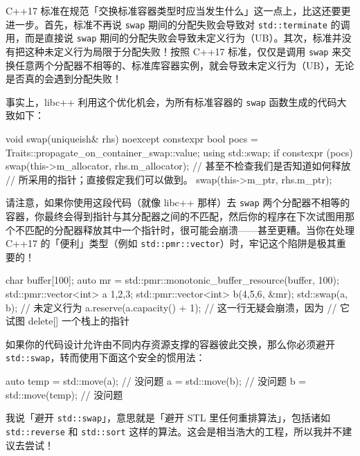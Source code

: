C++17 标准在规范「交换标准容器类型时应当发生什么」这一点上，比这还要更进一步。首先，标准不再说 \texttt{swap} 期间的分配失败会导致对 \texttt{std::\allowbreak{}terminate} 的调用，而是直接说 \texttt{swap} 期间的分配失败会导致未定义行为（UB）。其次，标准并没有把这种未定义行为局限于分配失败！按照 C++17 标准，仅仅是调用 \texttt{swap} 来交换任意两个分配器不相等的、标准库容器实例，就会导致未定义行为（UB），无论是否真的会遇到分配失败！

事实上，libc++ 利用这个优化机会，为所有标准容器的 \texttt{swap} 函数生成的代码大致如下：

\begin{codebox}[cpp]
    void swap(uniqueish& rhs) noexcept {
      constexpr bool pocs =
        Traits::propagate_on_container_swap::value;
      using std::swap;
      if constexpr (pocs) {
        swap(this->m_allocator, rhs.m_allocator);
      }
      // 甚至不检查我们是否知道如何释放
      // 所采用的指针；直接假定我们可以做到。
      swap(this->m_ptr, rhs.m_ptr);
    }
\end{codebox}

请注意，如果你使用这段代码（就像 libc++ 那样）去 \texttt{swap} 两个分配器不相等的容器，你最终会得到指针与其分配器之间的不匹配，然后你的程序在下次试图用那个不匹配的分配器释放其中一个指针时，很可能会崩溃——甚至更糟。当你在处理 C++17 的「便利」类型（例如 \texttt{std::\allowbreak{}pmr::\allowbreak{}vector}）时，牢记这个陷阱是极其重要的！

\begin{codebox}[cpp]
    char buffer[100];
    auto mr = std::pmr::monotonic_buffer_resource(buffer, 100);
    std::pmr::vector<int> a {1,2,3};
    std::pmr::vector<int> b({4,5,6}, &mr);
    std::swap(a, b);
      // 未定义行为
    a.reserve(a.capacity() + 1);
      // 这一行无疑会崩溃，因为
      // 它试图 delete[] 一个栈上的指针
\end{codebox}

如果你的代码设计允许由不同内存资源支撑的容器彼此交换，那么你必须避开 \texttt{std::\allowbreak{}swap}，转而使用下面这个安全的惯用法：

\begin{codebox}[cpp]
    auto temp = std::move(a); // 没问题
    a = std::move(b); // 没问题
    b = std::move(temp); // 没问题
\end{codebox}

我说「避开 \texttt{std::\allowbreak{}swap}」，意思就是「避开 STL 里任何重排算法」，包括诸如 \texttt{std::\allowbreak{}reverse} 和 \texttt{std::\allowbreak{}sort} 这样的算法。这会是相当浩大的工程，所以我并不建议去尝试！

